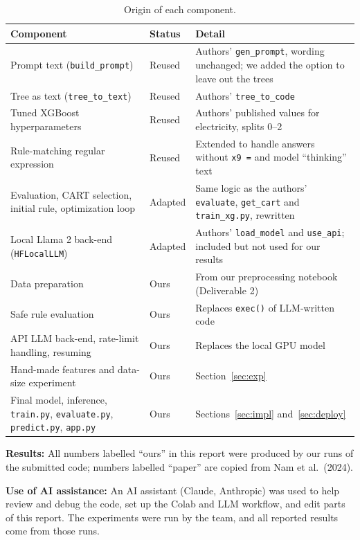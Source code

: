 \documentclass[11pt]{article}
\newcommand{\code}[1]{\texttt{#1}}
\begin{document}
\begin{table}[H]
\centering
\caption{Origin of each component.}
\label{tab:attr}
\begin{tabularx}{\linewidth}{@{}L{4.6cm}L{1.6cm}Y@{}}
\toprule
Component & Status & Detail \\
\midrule
Prompt text (\code{build\_prompt}) & Reused & Authors' \code{gen\_prompt}, wording unchanged; we added the option to leave out the trees \\
Tree as text (\code{tree\_to\_text}) & Reused & Authors' \code{tree\_to\_code} \\
Tuned XGBoost hyperparameters & Reused & Authors' published values for electricity, splits 0--2 \\
Rule-matching regular expression & Reused & Extended to handle answers without \code{x9 =} and model ``thinking'' text \\
Evaluation, CART selection, initial rule, optimization loop & Adapted & Same logic as the authors' \code{evaluate}, \code{get\_cart} and \code{train\_xg.py}, rewritten \\
Local Llama 2 back-end (\code{HFLocalLLM}) & Adapted & Authors' \code{load\_model} and \code{use\_api}; included but not used for our results \\
Data preparation & Ours & From our preprocessing notebook (Deliverable 2) \\
Safe rule evaluation & Ours & Replaces \code{exec()} of LLM-written code \\
API LLM back-end, rate-limit handling, resuming & Ours & Replaces the local GPU model \\
Hand-made features and data-size experiment & Ours & Section~\ref{sec:exp} \\
Final model, inference, \code{train.py}, \code{evaluate.py}, \code{predict.py}, \code{app.py} & Ours & Sections~\ref{sec:impl} and~\ref{sec:deploy} \\
\bottomrule
\end{tabularx}
\end{table}

\textbf{Results:} All numbers labelled ``ours'' in this report were produced by our runs of the
submitted code; numbers labelled ``paper'' are copied from Nam et al.\ (2024).

\textbf{Use of AI assistance:} An AI assistant (Claude, Anthropic) was used to help review and debug
the code, set up the Colab and LLM workflow, and edit parts of this report. The experiments were run
by the team, and all reported results come from those runs.
\end{document}
